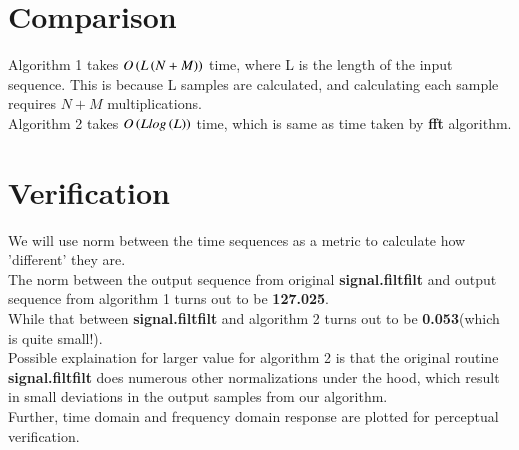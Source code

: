 \documentclass[journal,12pt,twocolumn]{IEEEtran}
\begin{document}
\section{Comparison}
Algorithm 1 takes $O\left(L\left(N+M\right)\right)$ time, where L is the length of the input sequence. This is because L samples are calculated, and calculating each sample requires $N+M$ multiplications. 
\\
Algorithm 2 takes $O\left(Llog\left(L\right)\right)$ time, which is same as time taken by \textbf{fft} algorithm.
\section{Verification}
We will use norm between the time sequences as a metric to calculate how 'different' they are.
\\
The norm between the output sequence from original \textbf{signal.filtfilt} and output sequence from algorithm 1 turns out to be \textbf{127.025}.
\\
While that between \textbf{signal.filtfilt} and algorithm 2 turns out to be \textbf{0.053}(which is quite small!).
\\
Possible explaination for larger value for algorithm 2 is that the original routine \textbf{signal.filtfilt} does numerous other normalizations under the hood, which result in small deviations in the output samples from our algorithm.
\\
Further, time domain and frequency domain response are plotted for perceptual verification.
\end{document}
